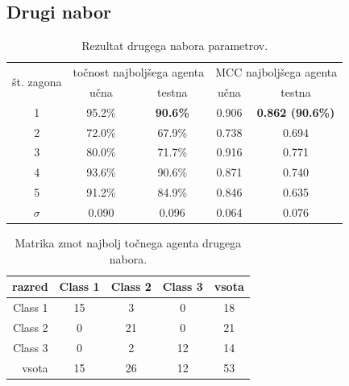 \subsection{Drugi nabor}\label{subsec:dodatek-wine-drugi-nabor}
\begin{table}[H]
    \begin{center}
        \begin{tabular}{|| c | c c || c c ||}
            \hline
            \multirow{2}{*}{št. zagona} & \multicolumn{2}{c||}{točnost najboljšega agenta} & \multicolumn{2}{c||}{MCC najboljšega agenta} \\ \cline{2-5}
            & učna   & testna          & učna  & testna                  \\
            \hline
            1        & 95.2\% & \textbf{90.6\%} & 0.906 & \textbf{0.862 (90.6\%)} \\
            \hline
            2        & 72.0\% & 67.9\%          & 0.738 & 0.694                   \\
            \hline
            3        & 80.0\% & 71.7\%          & 0.916 & 0.771                   \\
            \hline
            4        & 93.6\% & 90.6\%          & 0.871 & 0.740                   \\
            \hline
            5        & 91.2\% & 84.9\%          & 0.846 & 0.635                   \\
            \hline
            $\sigma$ & 0.090  & 0.096           & 0.064 & 0.076                   \\
            \hline
        \end{tabular}
    \end{center}
    \caption{Rezultat drugega nabora parametrov.}
    \label{tab:wine_result_2}
\end{table}

\begin{table}[H]
    \centering
    \begin{tabular}{||rcccc||}
        \hline
        razred  & Class 1 & Class 2 & Class 3 & vsota \\ \hline
        Class 1 & 15      & 3       & 0       & 18    \\ \hline
        Class 2 & 0       & 21      & 0       & 21    \\ \hline
        Class 3 & 0       & 2       & 12      & 14    \\ \hline
        vsota   & 15      & 26      & 12      & 53    \\ \hline
    \end{tabular}
    \caption{Matrika zmot najbolj točnega agenta drugega nabora.}
    \label{tab:wine_acc_2}
\end{table}

